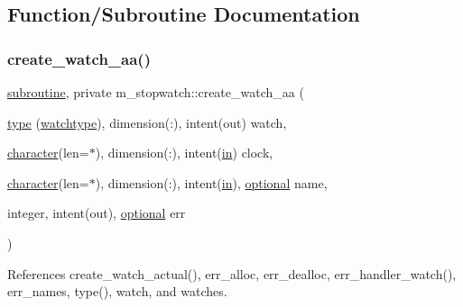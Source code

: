 \subsection{Function/\+Subroutine Documentation}
\mbox{\label{namespacem__stopwatch_a20bb67096d0fa8c6d12c8ae0022cc815}} 
\subsubsection{\texorpdfstring{create\+\_\+watch\+\_\+aa()}{create\_watch\_aa()}}
{\footnotesize\ttfamily \hyperlink{M__stopwatch_83_8txt_acfbcff50169d691ff02d4a123ed70482}{subroutine}, private m\+\_\+stopwatch\+::create\+\_\+watch\+\_\+aa (\begin{DoxyParamCaption}\item[{\hyperlink{stop__watch_83_8txt_a70f0ead91c32e25323c03265aa302c1c}{type} (\hyperlink{structm__stopwatch_1_1watchtype}{watchtype}), dimension(\+:), intent(out)}]{watch,  }\item[{\hyperlink{option__stopwatch_83_8txt_abd4b21fbbd175834027b5224bfe97e66}{character}(len=$\ast$), dimension(\+:), intent(\hyperlink{M__journal_83_8txt_afce72651d1eed785a2132bee863b2f38}{in})}]{clock,  }\item[{\hyperlink{option__stopwatch_83_8txt_abd4b21fbbd175834027b5224bfe97e66}{character}(len=$\ast$), dimension(\+:), intent(\hyperlink{M__journal_83_8txt_afce72651d1eed785a2132bee863b2f38}{in}), \hyperlink{option__stopwatch_83_8txt_aa4ece75e7acf58a4843f70fe18c3ade5}{optional}}]{name,  }\item[{integer, intent(out), \hyperlink{option__stopwatch_83_8txt_aa4ece75e7acf58a4843f70fe18c3ade5}{optional}}]{err }\end{DoxyParamCaption})\hspace{0.3cm}{\ttfamily [private]}}



References create\+\_\+watch\+\_\+actual(), err\+\_\+alloc, err\+\_\+dealloc, err\+\_\+handler\+\_\+watch(), err\+\_\+names, type(), watch, and watches.

